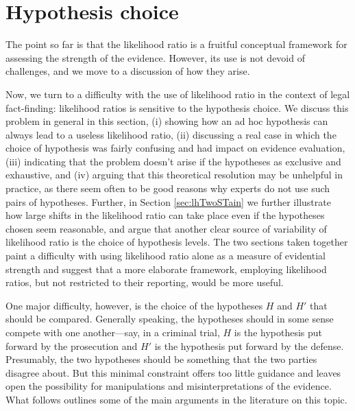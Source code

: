 \documentclass[
  10pt,
  dvipsnames,enabledeprecatedfontcommands]{scrartcl}
\newcommand{\mar}[1]{\todo[color=blue!40]{#1}}
\begin{document}
\hypertarget{hypothesis-choice}{%
\section{\texorpdfstring{Hypothesis choice
\label{sec:hchoice}}{Hypothesis choice }}\label{hypothesis-choice}}

\mar{revised these two intro passages, check }

The point so far is that the likelihood ratio is a fruitful conceptual
framework for assessing the strength of the evidence. However, its use
is not devoid of challenges, and we move to a discussion of how they
arise.

Now, we turn to a difficulty with the use of likelihood ratio in the
context of legal fact-finding: likelihood ratios is sensitive to the
hypothesis choice. We discuss this problem in general in this section,
(i) showing how an ad hoc hypothesis can always lead to a useless
likelihood ratio, (ii) discussing a real case in which the choice of
hypothesis was fairly confusing and had impact on evidence evaluation,
(iii) indicating that the problem doesn't arise if the hypotheses as
exclusive and exhaustive, and (iv) arguing that this theoretical
resolution may be unhelpful in practice, as there seem often to be good
reasons why experts do not use such pairs of hypotheses. Further, in
Section \ref{sec:lhTwoSTain} we further illustrate how large shifts in
the likelihood ratio can take place even if the hypotheses chosen seem
reasonable, and argue that another clear source of variability of
likelihood ratio is the choice of hypothesis levels. The two sections
taken together paint a difficulty with using likelihood ratio alone as a
measure of evidential strength and suggest that a more elaborate
framework, employing likelihood ratios, but not restricted to their
reporting, would be more useful.

One major difficulty, however, is the choice of the hypotheses \(H\) and
\(H'\) that should be compared. Generally speaking, the hypotheses
should in some sense compete with one another---say, in a criminal
trial, \(H\) is the hypothesis put forward by the prosecution and \(H'\)
is the hypothesis put forward by the defense. Presumably, the two
hypotheses should be something that the two parties disagree about. But
this minimal constraint offers too little guidance and leaves open the
possibility for manipulations and misinterpretations of the evidence.
What follows outlines some of the main arguments in the literature on
this topic.
\end{document}
